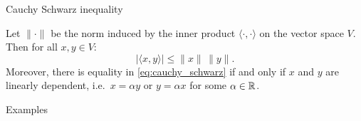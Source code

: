 \documentclass{beamer}
\begin{document}
\begin{frame}[t]{Cauchy Schwarz inequality}
\begin{theorem}
	Let $\| \cdot \|$ be the norm induced by the inner product $\langle \cdot , \cdot \rangle$ on the vector space $V$. Then for all $x,y \in V$:
	\begin{equation}\label{eq:cauchy_schwarz}
	| \langle x,y \rangle | \leq \|x\| \, \|y\|.
	\end{equation}
	Moreover, there is equality in \eqref{eq:cauchy_schwarz} if and only if $x$ and $y$ are linearly dependent, i.e.\ $x = \alpha y$ or $y = \alpha x$ for some $\alpha \in \mathbb{R}$.
\end{theorem}
\end{frame}


\begin{frame}[t]{Examples}
	\pause
\end{frame}
\end{document}
